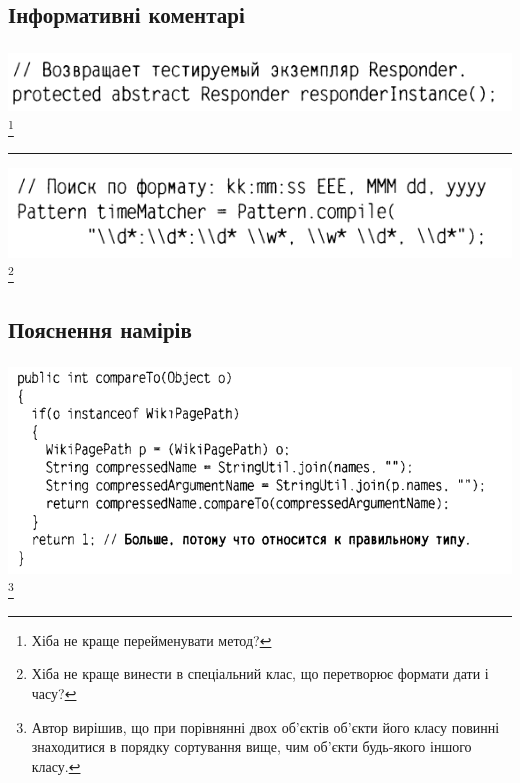 \documentclass[12pt,pdf,utf8,ukrainian,aspectratio=169]{beamer}
\makeatletter
\newcommand*{\currentname}{\@currentlabelname}
\makeatother
\begin{document}
	\subsection{Інформативні коментарі}
	\begin{frame}\frametitle{\currentname}
		\includegraphics[scale=0.8]{clean_code_4_1.png}
		\footnote{Хіба не краще перейменувати метод?}
		\hfill	
		\vfill	
		\noindent\rule{\textwidth}{1pt}
		\vfill
		\includegraphics[scale=0.8]{clean_code_4_2.png}
		\footnote{Хіба не краще винести в спеціальний клас, що перетворює формати дати і часу?}
		\hfill
	\end{frame}

	\subsection{Пояснення намірів}
	\begin{frame}\frametitle{\currentname}
		\includegraphics[scale=0.65]{clean_code_5_1.png}
		\footnote{Автор вирішив, що при порівнянні двох об'єктів об'єкти його класу повинні 
			знаходитися в порядку сортування вище, чим об'єкти будь-якого іншого класу.}
		\hfill	
	\end{frame}
	
\end{document}
